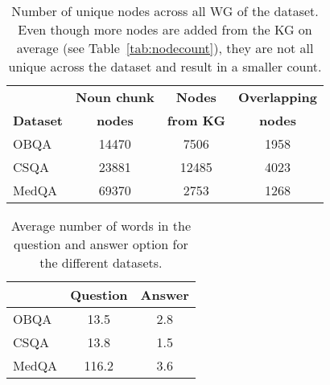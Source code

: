 \documentclass[11pt]{article}
\begin{document}
\begin{comment}
\section{CANP: QA Context-Aware Node Pruning}
\label{app:canp}
There are concept nodes which match with question, answer choice or don't match with them both. These extra concept nodes are one hop away from QA nodes in the KG. Although they are adding information about QA nodes they also add irrelevant noise too.
Table~\ref{tab:nodecount} shows the average number of nodes of different types in a WG. Number of extra concept nodes is very high compared to QA concept nodes except in MedQA dataset. This makes it necessary to prune these nodes to keep only the relevant ones. In case of MedQA since the number of extra nodes in WG are low and the nodes are domain specific we don't do any pruning.

\end{comment}












\begin{table}[t]
\caption{Number of unique nodes across all WG of the dataset.
Even though more nodes are added from the KG on average (see Table~\ref{tab:nodecount}), they are not all unique across the dataset and result in a smaller count.}
\centering
\tabcolsep=0.12cm
\begin{tabular}{l ccc}
\toprule
    & \textbf{Noun chunk} & \textbf{Nodes}    & \textbf{Overlapping} \\
\textbf{Dataset} & \textbf{nodes}  & \textbf{from KG}  & \textbf{nodes} \\
\midrule
OBQA  & 14470    & 7506  & 1958    \\
CSQA  & 23881    & 12485 & 4023    \\
MedQA & 69370    & 2753  & 1268    \\
\bottomrule
\end{tabular}

\label{tab:overlap}
\end{table}


\begin{table}[t]
\caption{Average number of words in the question  and answer option  for the different datasets.}
\centering
\tabcolsep=0.12cm
\begin{tabular}{l cc}
\toprule
  & \textbf{Question} & \textbf{Answer} \\
\midrule
OBQA  & 13.5     & 2.8 \\
CSQA  & 13.8     & 1.5 \\
MedQA & 116.2    & 3.6 \\
\bottomrule
\end{tabular}

\label{tab:wordcount}
\end{table}
\end{document}
